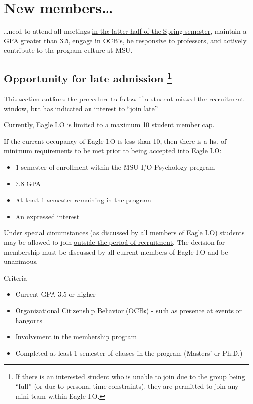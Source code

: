 \documentclass[
]{book}
\providecommand{\tightlist}{%
  \setlength{\itemsep}{0pt}\setlength{\parskip}{0pt}}
\begin{document}
\hypertarget{new-members}{%
\section{New members\ldots{}}\label{new-members}}

\ldots need to attend all meetings \protect\hyperlink{timetable}{in the latter half of the Spring semester}, maintain a GPA greater than 3.5, engage in OCB's, be responsive to professors, and actively contribute to the program culture at MSU.

\hypertarget{late}{%
\subsection[Opportunity for late admission ]{\texorpdfstring{Opportunity for late admission \footnote{If there is an interested student who is unable to join due to the group being ``full'' (or due to personal time constraints), they are permitted to join any mini-team within Eagle I.O.}}{Opportunity for late admission }}\label{late}}

This section outlines the procedure to follow if a student missed the recruitment window, but has indicated an interest to ``join late''

Currently, Eagle I.O is limited to a maximum 10 student member cap.

If the current occupancy of Eagle I.O is less than 10, then there is a list of minimum requirements to be met prior to being accepted into Eagle I.O:

\begin{itemize}
\tightlist
\item
  1 semester of enrollment within the MSU I/O Psychology program
\item
  3.8 GPA
\item
  At least 1 semester remaining in the program
\item
  An expressed interest
\end{itemize}

Under special circumstances (as discussed by all members of Eagle I.O) students may be allowed to join \protect\hyperlink{late}{outside the period of recruitment}. The decision for membership must be discussed by all current members of Eagle I.O and be unanimous.

Criteria

\begin{itemize}
\tightlist
\item
  Current GPA 3.5 or higher
\item
  Organizational Citizenship Behavior (OCBs) - such as presence at events or hangouts
\item
  Involvement in the membership program
\item
  Completed at least 1 semester of classes in the program (Masters' or Ph.D.)
\end{itemize}
\end{document}
